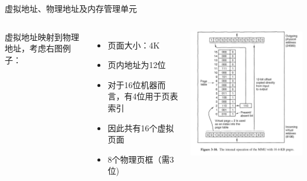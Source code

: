 \documentclass[xcolor=svgnames]{beamer}
\begin{document}
\begin{CJK*}{UTF8}{gbsn}
\begin{frame}{虚拟地址、物理地址及内存管理单元}
\begin{columns}%
虚拟地址映射到物理地址，考虑右图例子：
\begin{itemize}
\item 页面大小：4K 
\item 页内地址为12位
\item 对于16位机器而言，有4位用于页表索引
\item 因此共有16个虚拟页面
\item 8个物理页框（需3位)
\end{itemize}
\includegraphics[width=1.0\textwidth]{mmu2.png}
\end{columns}%
\end{frame}



\end{CJK*}
\end{document}
